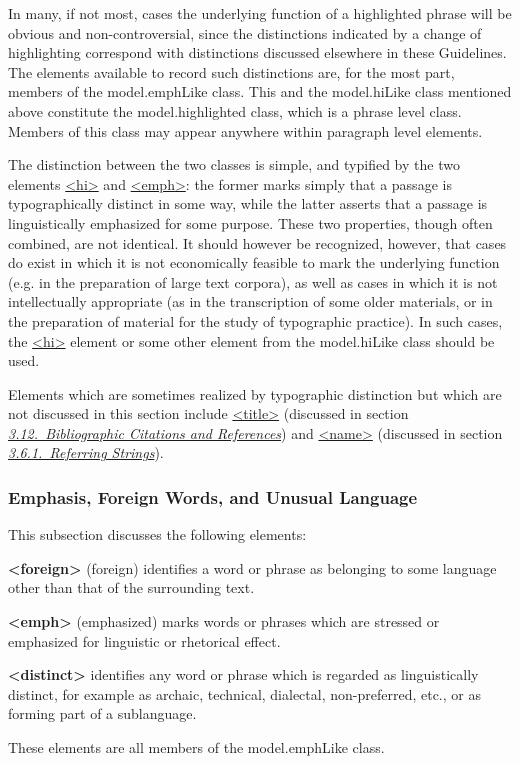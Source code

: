 In many, if not most, cases the underlying function of a highlighted phrase will be obvious and non-controversial, since the distinctions indicated by a change of highlighting correspond with distinctions discussed elsewhere in these Guidelines. The elements available to record such distinctions are, for the most part, members of the \textsf{model.emphLike} class. This and the \textsf{model.hiLike} class mentioned above constitute the \textsf{model.highlighted} class, which is a phrase level class. Members of this class may appear anywhere within paragraph level elements.\par
The distinction between the two classes is simple, and typified by the two elements \hyperref[TEI.hi]{<hi>} and \hyperref[TEI.emph]{<emph>}: the former marks simply that a passage is typographically distinct in some way, while the latter asserts that a passage is linguistically emphasized for some purpose. These two properties, though often combined, are not identical. It should however be recognized, however, that cases do exist in which it is not economically feasible to mark the underlying function (e.g. in the preparation of large text corpora), as well as cases in which it is not intellectually appropriate (as in the transcription of some older materials, or in the preparation of material for the study of typographic practice). In such cases, the \hyperref[TEI.hi]{<hi>} element or some other element from the \textsf{model.hiLike} class should be used.\par
Elements which are sometimes realized by typographic distinction but which are not discussed in this section include \hyperref[TEI.title]{<title>} (discussed in section \textit{\hyperref[COBI]{3.12.\ Bibliographic Citations and References}}) and \hyperref[TEI.name]{<name>} (discussed in section \textit{\hyperref[CONARS]{3.6.1.\ Referring Strings}}).
\subsubsection[{Emphasis, Foreign Words, and Unusual Language}]{Emphasis, Foreign Words, and Unusual Language}\label{COHQH}\par
This subsection discusses the following elements: 
\begin{sansreflist}
  
\item [\textbf{<foreign>}] (foreign) identifies a word or phrase as belonging to some language other than that of the surrounding text.
\item [\textbf{<emph>}] (emphasized) marks words or phrases which are stressed or emphasized for linguistic or rhetorical effect.
\item [\textbf{<distinct>}] identifies any word or phrase which is regarded as linguistically distinct, for example as archaic, technical, dialectal, non-preferred, etc., or as forming part of a sublanguage.
\end{sansreflist}
 These elements are all members of the \textsf{model.emphLike} class.
